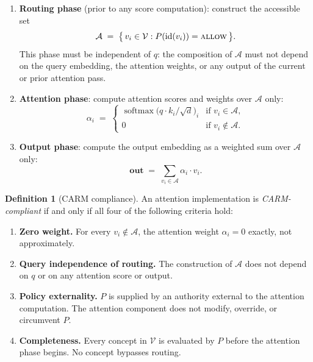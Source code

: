 \documentclass[11pt,a4paper]{article}
\theoremstyle{definition}
\newtheorem{definition}[theorem]{Definition}
\newcommand{\ALLOW}{\mbox{\textsc{allow}}}
\newcommand{\vocab}{\mathcal{V}}
\newcommand{\acc}{\mathcal{A}}
\newcommand{\policy}{P}
\begin{document}
\begin{enumerate}[label=\textbf{Phase \arabic*.}, leftmargin=*, widest=Phase 3.]
  \item \textbf{Routing phase} (prior to any score computation): construct the
        accessible set
        \[
          \acc \;=\; \bigl\{\, v_i \in \vocab : \policy(\mathrm{id}(v_i)) =
          \ALLOW \,\bigr\}.
        \]
        This phase must be independent of $q$: the composition of $\acc$ must not
        depend on the query embedding, the attention weights, or any output of the
        current or prior attention pass.

  \item \textbf{Attention phase}: compute attention scores and weights over $\acc$
        only:
        \[
          \alpha_i \;=\;
          \begin{cases}
            \operatorname{softmax}\!\bigl(q \cdot k_i / \sqrt{d}\bigr)_i
              & \text{if } v_i \in \acc, \\
            0 & \text{if } v_i \notin \acc.
          \end{cases}
        \]

  \item \textbf{Output phase}: compute the output embedding as a weighted sum over
        $\acc$ only:
        \[
          \mathbf{out} \;=\; \sum_{v_i \in \acc} \alpha_i \cdot v_i.
        \]
\end{enumerate}

\begin{definition}[CARM compliance]
\label{def:carm}
An attention implementation is \emph{CARM-compliant} if and only if all four of
the following criteria hold:
\begin{enumerate}[label=\textbf{(C\arabic*)}]
  \item \textbf{Zero weight.} For every $v_i \notin \acc$, the attention weight
        $\alpha_i = 0$ exactly, not approximately.
  \item \textbf{Query independence of routing.} The construction of $\acc$ does not
        depend on $q$ or on any attention score or output.
  \item \textbf{Policy externality.} $\policy$ is supplied by an authority external
        to the attention computation. The attention component does not modify,
        override, or circumvent $\policy$.
  \item \textbf{Completeness.} Every concept in $\vocab$ is evaluated by $\policy$
        before the attention phase begins. No concept bypasses routing.
\end{enumerate}
\end{definition}
\end{document}

